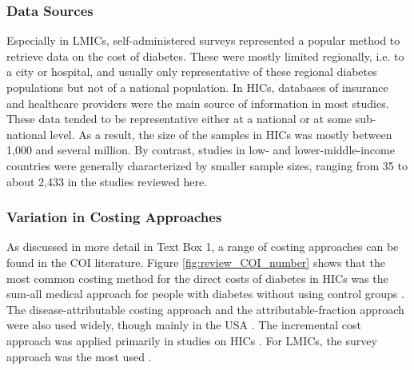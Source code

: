 \documentclass[12pt,english]{article}
\begin{document}
\subsubsection{Data Sources}
Especially in \acp{LMIC}, self-administered surveys represented a popular method to retrieve data on the cost of diabetes. These were mostly limited regionally, i.e. to a city or hospital, and usually only representative of these regional diabetes populations but not of a national population. In \acp{HIC}, databases of insurance and healthcare providers were the main source of information in most studies. These data tended to be representative either at a national or at some sub-national level. As a result, the size of the samples in \acp{HIC} was mostly between 1,000 and several million. By contrast, studies in low- and lower-middle-income countries were generally characterized by smaller sample sizes, ranging from 35 \parencite{Suleiman2006} to about 2,433 \parencite{Yang2012} in the studies reviewed here.

\subsubsection{Variation in Costing Approaches}
As discussed in more detail in Text Box 1, a range of costing approaches can be found in the \ac{COI} literature. Figure \ref{fig:review_COI_number} shows that the most common costing method for the direct costs of diabetes in \acp{HIC} was the sum-all medical approach for people with diabetes without using control groups \parencite{Kirigia2009,Boutayeb2014,Barcelo2003,Jonsson2002b,Ohinmaa2004,Lau2011a,Pohar2007,Gonzalez2009b,Horak2009,Martin2007b,Nolan2006c,Lucioni2003,Morsanutto2006b,Nakamura2008,Arredondo2004,Arredondo2007,Arredondo2005a,Arredondo2011b,Redekop2002b,Bjegovic2007b,Oliva2004a,Ringborg2008a,Chi2011a,Zhou2005a,Condliffe2013,Brandle2003d,Peele2002a,Lee2006,Maciejewski2004}. The disease-attributable costing approach \parencite{Suleiman2006,Abdulkadri2009b,Davis2006b,Simpson2003,RodriguezBolanos2010a,Solli2010a,Ballesta2006,Mata2002a,Lin2004,Dall2003a,Buescher2010,Tunceli2010c,Johnson2006d,Honkasalo2014,Bastida2002} and the attributable-fraction approach were also used widely, though mainly in the USA \parencite{AmericalDiabetesAssociation2008,Dawson2002b,Schmitt-Koopmann2004b,Dall2010,Bolin2009d,Honeycutt2009a,Lesniowska2014}. The incremental cost approach was applied primarily in studies on \acp{HIC} \parencite{Smith-Spangler2012,Yang2012,Tunceli2010c,Honeycutt2009a,Pohar2007a,Ricordeau2003,Koster2011c,Koster2006c,Koster2012,Esteghamati2009,Chodick2005a,Marchesini2011b,Bruno2012,Norlund2001a,Wirehn2008b,Birnbaum2003c,Durden2009b,Rodbard2010b,Oconnell2012,Trogdon2008a,Ramsey2002a,VanderLinden2009c}.  For \acp{LMIC}, the survey approach was the most used \parencite{Wang2009b,Wang2009f,Chan2007a,Ramachandran2007d,Javanbakht2011b,Khowaja2007a,Biorac2009a,Elrayah-Eliadarous2010b,Chatterjee2011c,Al-Maskari2010c,Druss2001,Tharkar2010a,Wang2010c}.
\end{document}
